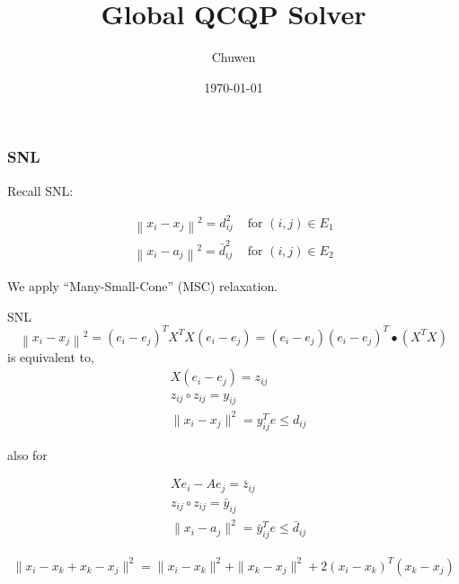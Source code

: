 
\usepackage{subfig}
\usepackage[style=verbose]{biblatex}
\usepackage{bm}
\title{Global QCQP Solver}
\author{Chuwen}
\date{\today}




\fontsize{8pt}{11.2}\selectfont
\frame{\titlepage}



\begin{frame}
  \frametitle{SNL}
  Recall SNL:

  \begin{align*}
    \left\|x_{i}-x_{j}\right\|^{2}=d_{i j}^{2}       & \text { for }(i, j) \in E_{1} \\
    \left\|x_{i}-a_{j}\right\|^{2}=\bar{d}_{i j}^{2} & \text { for }(i, j) \in E_{2}
  \end{align*}

  We apply ``Many-Small-Cone'' (MSC) relaxation.
\end{frame}


\begin{frame}{SNL}
  \begin{equation}
    \left\|x_{i}-x_{j}\right\|^{2} =\left(e_{i}-e_{j}\right)^{T} X^{T} X\left(e_{i}-e_{j}\right)=\left(e_{i}-e_{j}\right)\left(e_{i}-e_{j}\right)^{T} \bullet\left(X^{T} X\right)
  \end{equation}
  is equivalent to,
  \begin{equation}
    \begin{aligned}
       & X(e_i - e_j) = z_{ij}                     \\
       & z_{ij} \circ z_{ij} = y_{ij}              \\
       & \|x_{i}-x_{j}\|^2 = y_{ij}^T e \le d_{ij}
    \end{aligned}
  \end{equation}

  also for

  \begin{equation}
    \begin{aligned}
       & Xe_i - A e_j = \bar z_{ij}                          \\
       & z_{ij} \circ z_{ij} = \bar y_{ij}                   \\
       & \|x_{i}-a_{j}\|^2 = \bar y_{ij}^T e \le \bar d_{ij}
    \end{aligned}
  \end{equation}
\end{frame}

\begin{frame}
  \begin{equation}
    \begin{aligned}
      \|x_i - x_k + x_k - x_j\|^2 = \|x_i - x_k\|^2 + \|x_k - x_j\|^2 + 2(x_i - x_k)^T (x_k - x_j)
    \end{aligned}
  \end{equation}
\end{frame}




